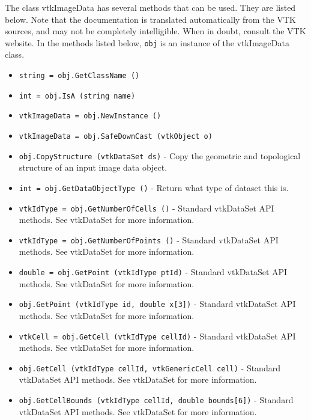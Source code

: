 The class vtkImageData has several methods that can be used.
  They are listed below.
Note that the documentation is translated automatically from the VTK sources,
and may not be completely intelligible.  When in doubt, consult the VTK website.
In the methods listed below, \verb|obj| is an instance of the vtkImageData class.
\begin{itemize}
\item  \verb|string = obj.GetClassName ()|

\item  \verb|int = obj.IsA (string name)|

\item  \verb|vtkImageData = obj.NewInstance ()|

\item  \verb|vtkImageData = obj.SafeDownCast (vtkObject o)|

\item  \verb|obj.CopyStructure (vtkDataSet ds)| -  Copy the geometric and topological structure of an input image data
 object.

\item  \verb|int = obj.GetDataObjectType ()| -  Return what type of dataset this is.

\item  \verb|vtkIdType = obj.GetNumberOfCells ()| -  Standard vtkDataSet API methods. See vtkDataSet for more information.

\item  \verb|vtkIdType = obj.GetNumberOfPoints ()| -  Standard vtkDataSet API methods. See vtkDataSet for more information.

\item  \verb|double = obj.GetPoint (vtkIdType ptId)| -  Standard vtkDataSet API methods. See vtkDataSet for more information.

\item  \verb|obj.GetPoint (vtkIdType id, double x[3])| -  Standard vtkDataSet API methods. See vtkDataSet for more information.

\item  \verb|vtkCell = obj.GetCell (vtkIdType cellId)| -  Standard vtkDataSet API methods. See vtkDataSet for more information.

\item  \verb|obj.GetCell (vtkIdType cellId, vtkGenericCell cell)| -  Standard vtkDataSet API methods. See vtkDataSet for more information.

\item  \verb|obj.GetCellBounds (vtkIdType cellId, double bounds[6])| -  Standard vtkDataSet API methods. See vtkDataSet for more information.


\end{itemize}
